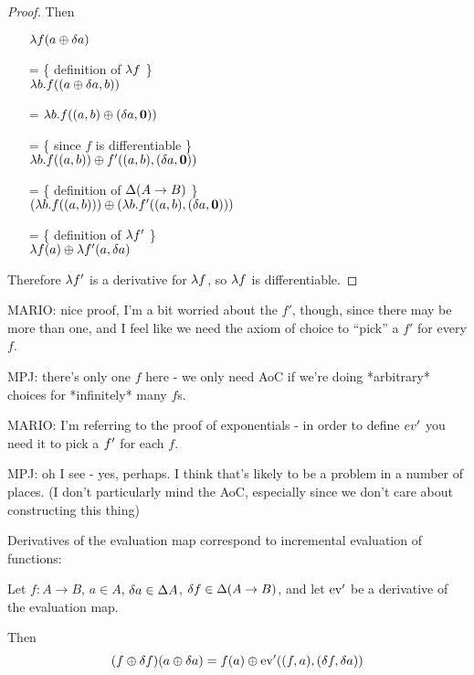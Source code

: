 \begin{proof}
  Then
  \begin{itemize}
    \item[ ]$\lambda f(a \oplus \delta a)$
    \item[=]\{ definition of $\lambda f$ \}\\
      $\lambda b. f((a \oplus \delta a, b))$
    \item[=] $\lambda b. f((a, b) \oplus (\delta a, \textbf{0}))$
    \item[=]\{ since $f$ is differentiable \}\\
      $\lambda b. f((a, b)) \oplus f'((a, b), (\delta a, \textbf{0}))$
    \item[=]\{ definition of $\Delta (A \rightarrow B)$ \}\\
      $(\lambda b. f((a, b))) \oplus (\lambda b. f'((a, b), (\delta a, \textbf{0})))$
    \item[=]\{ definition of $\lambda f'$ \}\\
      $\lambda f(a) \oplus \lambda f'(a, \delta a)$
  \end{itemize}

  Therefore $\lambda f'$ is a derivative for $\lambda f$, so $\lambda f$
  is differentiable.
\end{proof}

MARIO: nice proof, I'm a bit worried about the $f'$, though, since there may be more than one,
and I feel like we need the axiom of choice to ``pick'' a $f'$ for every $f$.

MPJ: there's only one $f$ here - we only need AoC if we're doing *arbitrary*
choices for *infinitely* many $f$s.

MARIO: I'm referring to the proof of exponentials - in order to define $ev'$ you
need it to pick a $f'$ for each $f$.

MPJ: oh I see - yes, perhaps. I think that's likely to be a problem in a number
of places. (I don't particularly mind the AoC, especially since we don't care
about constructing this thing)

Derivatives of the evaluation map correspond to incremental evaluation of functions:

\begin{prop}[Incrementalization]
\label{prop:incrementalization}
  Let $f: A \rightarrow B$, $a \in A$, $\delta a \in
  \Delta A$, $\delta f \in \Delta (A \rightarrow B)$, and let
  $\operatorname{ev}'$ be a derivative of the evaluation map.

  Then 
  $$(f \oplus \delta f)(a \oplus \delta a) = f(a) \oplus \operatorname{ev}'((f, a), (\delta f, \delta a))$$
\end{prop}

